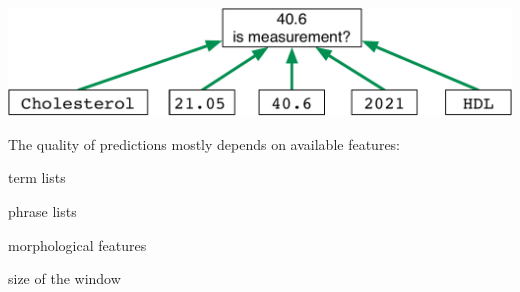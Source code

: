 \documentclass[landscape,footrule]{foils}
\begin{document}

\centerline{\includegraphics[scale=1.0, trim= 0cm 0.0cm -3cm 0cm, clip]{prediction-window}}

The quality of predictions mostly depends on available features:
\begin{triangles}
\item term lists
\item phrase lists
\item morphological features
\item size of the window
\end{triangles}  

\enlargethispage{3cm}
\end{document}
